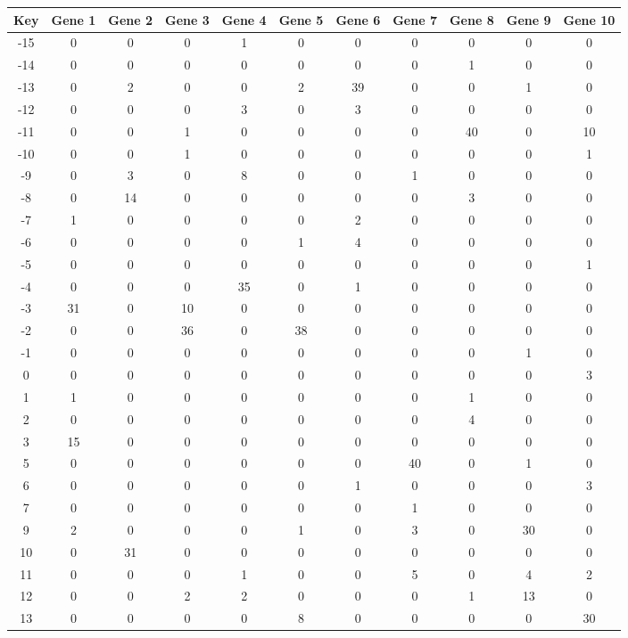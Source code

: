 \begin{tabular}{|c|c|c|c|c|c|c|c|c|c|c|}
\hline
Key & Gene 1 & Gene 2 & Gene 3 & Gene 4 & Gene 5 & Gene 6 & Gene 7 & Gene 8 & Gene 9 & Gene 10 \\
\hline
-15 & 0 & 0 & 0 & 1 & 0 & 0 & 0 & 0 & 0 & 0 \\
-14 & 0 & 0 & 0 & 0 & 0 & 0 & 0 & 1 & 0 & 0 \\
-13 & 0 & 2 & 0 & 0 & 2 & 39 & 0 & 0 & 1 & 0 \\
-12 & 0 & 0 & 0 & 3 & 0 & 3 & 0 & 0 & 0 & 0 \\
-11 & 0 & 0 & 1 & 0 & 0 & 0 & 0 & 40 & 0 & 10 \\
-10 & 0 & 0 & 1 & 0 & 0 & 0 & 0 & 0 & 0 & 1 \\
-9 & 0 & 3 & 0 & 8 & 0 & 0 & 1 & 0 & 0 & 0 \\
-8 & 0 & 14 & 0 & 0 & 0 & 0 & 0 & 3 & 0 & 0 \\
-7 & 1 & 0 & 0 & 0 & 0 & 2 & 0 & 0 & 0 & 0 \\
-6 & 0 & 0 & 0 & 0 & 1 & 4 & 0 & 0 & 0 & 0 \\
-5 & 0 & 0 & 0 & 0 & 0 & 0 & 0 & 0 & 0 & 1 \\
-4 & 0 & 0 & 0 & 35 & 0 & 1 & 0 & 0 & 0 & 0 \\
-3 & 31 & 0 & 10 & 0 & 0 & 0 & 0 & 0 & 0 & 0 \\
-2 & 0 & 0 & 36 & 0 & 38 & 0 & 0 & 0 & 0 & 0 \\
-1 & 0 & 0 & 0 & 0 & 0 & 0 & 0 & 0 & 1 & 0 \\
0 & 0 & 0 & 0 & 0 & 0 & 0 & 0 & 0 & 0 & 3 \\
1 & 1 & 0 & 0 & 0 & 0 & 0 & 0 & 1 & 0 & 0 \\
2 & 0 & 0 & 0 & 0 & 0 & 0 & 0 & 4 & 0 & 0 \\
3 & 15 & 0 & 0 & 0 & 0 & 0 & 0 & 0 & 0 & 0 \\
5 & 0 & 0 & 0 & 0 & 0 & 0 & 40 & 0 & 1 & 0 \\
6 & 0 & 0 & 0 & 0 & 0 & 1 & 0 & 0 & 0 & 3 \\
7 & 0 & 0 & 0 & 0 & 0 & 0 & 1 & 0 & 0 & 0 \\
9 & 2 & 0 & 0 & 0 & 1 & 0 & 3 & 0 & 30 & 0 \\
10 & 0 & 31 & 0 & 0 & 0 & 0 & 0 & 0 & 0 & 0 \\
11 & 0 & 0 & 0 & 1 & 0 & 0 & 5 & 0 & 4 & 2 \\
12 & 0 & 0 & 2 & 2 & 0 & 0 & 0 & 1 & 13 & 0 \\
13 & 0 & 0 & 0 & 0 & 8 & 0 & 0 & 0 & 0 & 30 \\
\hline
\end{tabular}